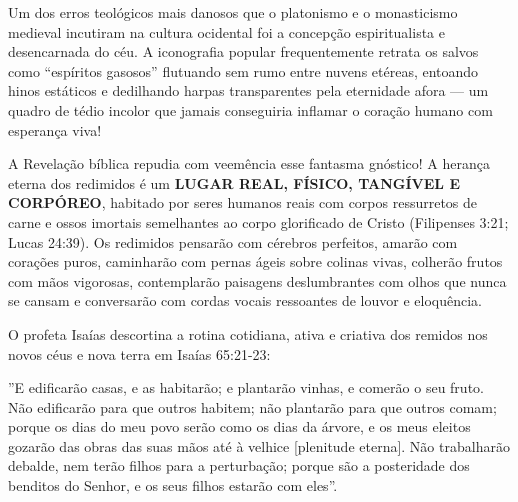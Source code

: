 \documentclass[11pt,a4paper,openany]{book}
\begin{document}
Um dos erros teológicos mais danosos que o platonismo e o monasticismo medieval incutiram na cultura ocidental foi a concepção espiritualista e desencarnada do céu. A iconografia popular frequentemente retrata os salvos como ``espíritos gasosos'' flutuando sem rumo entre nuvens etéreas, entoando hinos estáticos e dedilhando harpas transparentes pela eternidade afora — um quadro de tédio incolor que jamais conseguiria inflamar o coração humano com esperança viva!

A Revelação bíblica repudia com veemência esse fantasma gnóstico!
A herança eterna dos redimidos é um \textbf{LUGAR REAL, FÍSICO, TANGÍVEL E CORPÓREO}, habitado por seres humanos reais com corpos ressurretos de carne e ossos imortais semelhantes ao corpo glorificado de Cristo (Filipenses 3:21; Lucas 24:39).
Os redimidos pensarão com cérebros perfeitos, amarão com corações puros, caminharão com pernas ágeis sobre colinas vivas, colherão frutos com mãos vigorosas, contemplarão paisagens deslumbrantes com olhos que nunca se cansam e conversarão com cordas vocais ressoantes de louvor e eloquência.

O profeta Isaías descortina a rotina cotidiana, ativa e criativa dos remidos nos novos céus e nova terra em Isaías 65:21-23:

''E edificarão casas, e as habitarão; e plantarão vinhas, e comerão o seu fruto.
Não edificarão para que outros habitem; não plantarão para que outros comam; porque os dias do meu povo serão como os dias da árvore, e os meus eleitos gozarão das obras das suas mãos até à velhice [plenitude eterna].
Não trabalharão debalde, nem terão filhos para a perturbação; porque são a posteridade dos benditos do Senhor, e os seus filhos estarão com eles''.
\end{document}
